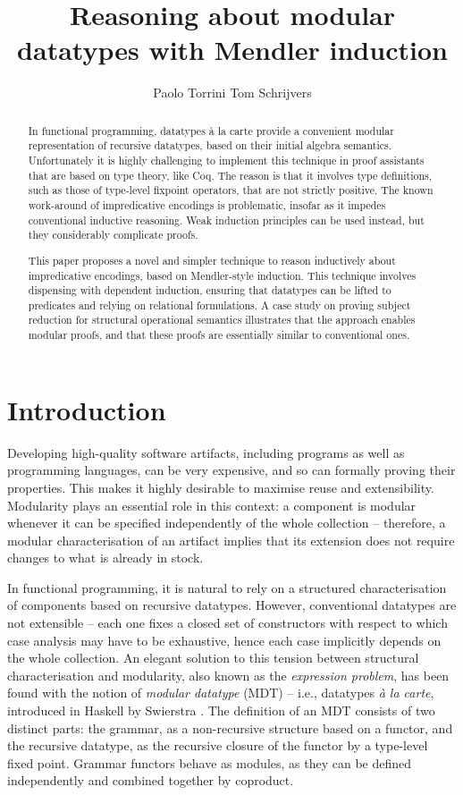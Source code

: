 \documentclass[submission,copyright,creativecommons]{eptcs}
\title{Reasoning about modular datatypes with Mendler induction}
\author{ Paolo Torrini \qquad \qquad Tom Schrijvers
  \institute{\\Department of Computer Science, KU Leuven, Belgium} 
\email{\quad \{p.torrini, tom.schrijvers\}@cs.kuleuven.be}
}
\newcounter{prop}
\begin{document}
\maketitle              


\begin{abstract}
In functional programming, datatypes \`{a} la carte provide a
convenient modular representation of recursive datatypes, based on
their initial algebra semantics. Unfortunately it is highly
challenging to implement this technique in proof assistants that are
based on type theory, like Coq. The reason is that it involves type
definitions, such as those of type-level fixpoint operators, that are
not strictly positive. The known work-around of impredicative
encodings is problematic, insofar as it impedes conventional inductive
reasoning.  Weak induction principles can be used instead, but they
considerably complicate proofs.

This paper proposes a novel and simpler technique to reason
inductively about impredicative encodings, based on Mendler-style
induction. This technique involves dispensing with dependent
induction, ensuring that datatypes can be lifted to predicates and
relying on relational formulations. A case study on proving subject
reduction for structural operational semantics illustrates that the
approach enables modular proofs, and that these proofs are essentially
similar to conventional ones.
\end{abstract}




\section{Introduction} 
\label{Introduction} 


Developing high-quality software artifacts, including programs as well
as programming languages, can be very expensive, and so can formally
proving their properties. This makes it highly desirable to maximise
reuse and extensibility. Modularity plays an essential role in this
context: a component is modular whenever it can be specified
independently of the whole collection -- therefore, a modular
characterisation of an artifact implies that its extension does not
require changes to what is already in stock.

In functional programming, it is natural to rely on a structured
characterisation of components based on recursive datatypes. However,
conventional datatypes are not extensible -- each one fixes a closed
set of constructors with respect to which case analysis may have to be
exhaustive, hence each case implicitly depends on the whole
collection. An elegant solution to this tension between structural
characterisation and modularity, also known as the \emph{expression
  problem}, has been found with the notion of \emph{modular datatype}
(MDT) -- i.e., datatypes \emph{\`{a} la carte}, introduced in Haskell
by Swierstra \cite{Swier08}.  The definition of an MDT consists of two
distinct parts: the grammar, as a non-recursive structure based on a
functor, and the recursive datatype, as the recursive closure of the
functor by a type-level fixed point. Grammar functors behave as
modules, as they can be defined independently and combined together by
coproduct.
\end{document}
